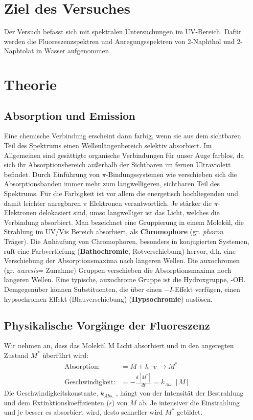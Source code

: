 \documentclass[12pt]{article}
\begin{document}
\section{Ziel des Versuches}
Der Versuch befasst sich mit spektralen Untersuchungen im UV-Bereich.
Dafür werden die Fluoreszenzspektren und Anregungsspektren von 2-Naphthol und 2-Naphtolat in Wasser aufgenommen.
\section {Theorie}
\subsection{Absorption und Emission\supercite{og}}
Eine chemische Verbindung erscheint dann farbig, wenn sie aus dem sichtbaren Teil des Spektrums einen Wellenlängenbereich selektiv absorbiert.
Im Allgemeinen sind gesättigte organische Verbindungen für unser Auge farblos,
da sich ihr Absorptionsbereich außerhalb der Sichtbaren im fernen Ultraviolett
befindet. Durch Einführung von $\pi$-Bindungssystemen wie verschieben sich
die Absorptionsbanden immer mehr zum langwelligeren, sichtbaren Teil des Spektrums.
Für die Farbigkeit ist vor allem die energetisch hochliegenden und damit leichter anregbaren $\pi$ Elektronen verantwortlich.
Je stärker die $\pi$-Elektronen delokasiert sind, umso langwelliger ist das Licht, welches die Verbindung absorbiert.
Man bezeichnet eine Gruppierung in einem Molekül, die Strahlung im UV/Vis Bereich absorbiert, 
als \textbf{Chromophore} (gr. \textit{phoron} = Träger). Die Anhäufung von Chromophoren,
besonders in konjugierten Systemen, ruft eine Farbvertiefung (\textbf{Bathochromie}, Rotverschiebung) hervor, d.h. eine Verschiebung der Absorptionsmaxima nach längeren Wellen.
Die auxochromen (gr. \textit{auxesis}= Zunahme) Gruppen verschieben die Absorptionsmaxima noch längeren Wellen. Eine typische, auxochrome Gruppe ist die Hydroxgruppe,
-OH. Demgegenüber können Substituenten, die über einen $-I$-Effekt verfügen, einen hypsochromen Effekt (Blauverschiebung) (\textbf{Hypsochromie}) auslösen.

\subsection{Physikalische Vorgänge der Fluoreszenz\supercite{harris}}
Wir nehmen an, dass das Molekül M Licht absorbiert und in den angeregten Zustand $M^*$
überführt wird:
\begin{align*}
  \text{Absorption:} &= M + h \cdot v \, \rightarrow M^*\\
  \text{Geschwindigkeit:} &= - \frac{d[M^*]}{dt} = k _{Abs.} [M]
\end{align*}
Die Geschwindigkeitskonstante, $k_{Abs.}$ , hängt von der Intensität der Bestrahlung und
dem Extinktionskoeffizienten ($\epsilon$) von $M$ ab. Je intensiver die Einstrahlung und je besser es
absorbiert wird, desto schneller wird $M^*$ gebildet.
\end{document}
